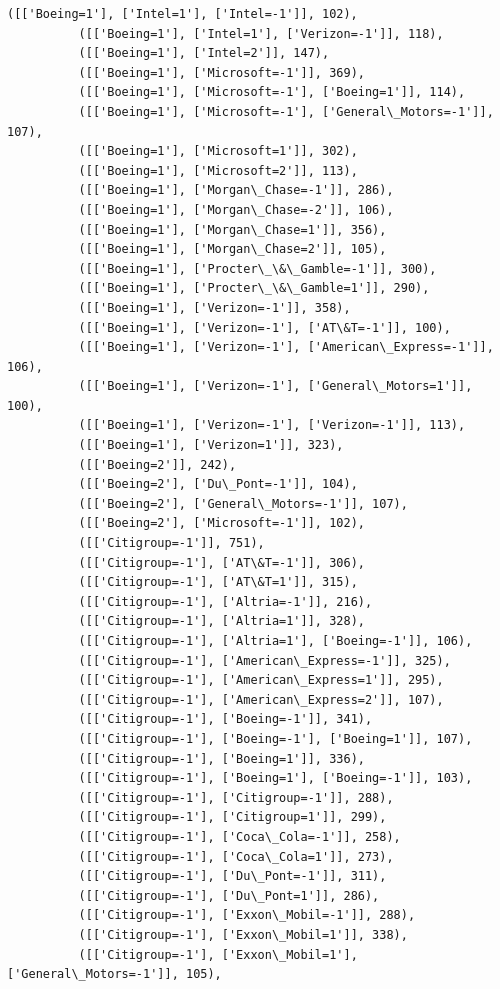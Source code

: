 \documentclass[11pt]{article}
\begin{document}
\begin{Verbatim}[commandchars=\\\{\}]
          ([['Boeing=1'], ['Intel=1'], ['Intel=-1']], 102),
          ([['Boeing=1'], ['Intel=1'], ['Verizon=-1']], 118),
          ([['Boeing=1'], ['Intel=2']], 147),
          ([['Boeing=1'], ['Microsoft=-1']], 369),
          ([['Boeing=1'], ['Microsoft=-1'], ['Boeing=1']], 114),
          ([['Boeing=1'], ['Microsoft=-1'], ['General\_Motors=-1']], 107),
          ([['Boeing=1'], ['Microsoft=1']], 302),
          ([['Boeing=1'], ['Microsoft=2']], 113),
          ([['Boeing=1'], ['Morgan\_Chase=-1']], 286),
          ([['Boeing=1'], ['Morgan\_Chase=-2']], 106),
          ([['Boeing=1'], ['Morgan\_Chase=1']], 356),
          ([['Boeing=1'], ['Morgan\_Chase=2']], 105),
          ([['Boeing=1'], ['Procter\_\&\_Gamble=-1']], 300),
          ([['Boeing=1'], ['Procter\_\&\_Gamble=1']], 290),
          ([['Boeing=1'], ['Verizon=-1']], 358),
          ([['Boeing=1'], ['Verizon=-1'], ['AT\&T=-1']], 100),
          ([['Boeing=1'], ['Verizon=-1'], ['American\_Express=-1']], 106),
          ([['Boeing=1'], ['Verizon=-1'], ['General\_Motors=1']], 100),
          ([['Boeing=1'], ['Verizon=-1'], ['Verizon=-1']], 113),
          ([['Boeing=1'], ['Verizon=1']], 323),
          ([['Boeing=2']], 242),
          ([['Boeing=2'], ['Du\_Pont=-1']], 104),
          ([['Boeing=2'], ['General\_Motors=-1']], 107),
          ([['Boeing=2'], ['Microsoft=-1']], 102),
          ([['Citigroup=-1']], 751),
          ([['Citigroup=-1'], ['AT\&T=-1']], 306),
          ([['Citigroup=-1'], ['AT\&T=1']], 315),
          ([['Citigroup=-1'], ['Altria=-1']], 216),
          ([['Citigroup=-1'], ['Altria=1']], 328),
          ([['Citigroup=-1'], ['Altria=1'], ['Boeing=-1']], 106),
          ([['Citigroup=-1'], ['American\_Express=-1']], 325),
          ([['Citigroup=-1'], ['American\_Express=1']], 295),
          ([['Citigroup=-1'], ['American\_Express=2']], 107),
          ([['Citigroup=-1'], ['Boeing=-1']], 341),
          ([['Citigroup=-1'], ['Boeing=-1'], ['Boeing=1']], 107),
          ([['Citigroup=-1'], ['Boeing=1']], 336),
          ([['Citigroup=-1'], ['Boeing=1'], ['Boeing=-1']], 103),
          ([['Citigroup=-1'], ['Citigroup=-1']], 288),
          ([['Citigroup=-1'], ['Citigroup=1']], 299),
          ([['Citigroup=-1'], ['Coca\_Cola=-1']], 258),
          ([['Citigroup=-1'], ['Coca\_Cola=1']], 273),
          ([['Citigroup=-1'], ['Du\_Pont=-1']], 311),
          ([['Citigroup=-1'], ['Du\_Pont=1']], 286),
          ([['Citigroup=-1'], ['Exxon\_Mobil=-1']], 288),
          ([['Citigroup=-1'], ['Exxon\_Mobil=1']], 338),
          ([['Citigroup=-1'], ['Exxon\_Mobil=1'], ['General\_Motors=-1']], 105),

\end{Verbatim}
\end{document}
